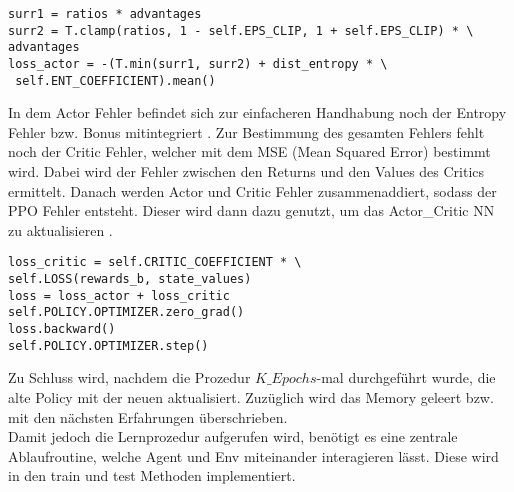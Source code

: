 \begin{lstlisting}[caption=Bestimmung der Surrogate Fehler, label=code:Bestimmung_Surrogate_Losses, style=Python]
surr1 = ratios * advantages
surr2 = T.clamp(ratios, 1 - self.EPS_CLIP, 1 + self.EPS_CLIP) * \
advantages
loss_actor = -(T.min(surr1, surr2) + dist_entropy * \
 self.ENT_COEFFICIENT).mean()
\end{lstlisting}
In dem Actor Fehler befindet sich zur einfacheren Handhabung noch der Entropy Fehler bzw. Bonus mitintegriert .
Zur Bestimmung des gesamten Fehlers fehlt noch der Critic Fehler, welcher mit dem MSE (Mean Squared Error) bestimmt wird. Dabei wird der Fehler zwischen den Returns und den Values des Critics ermittelt.
Danach werden Actor und Critic Fehler zusammenaddiert, sodass der  PPO Fehler entsteht. Dieser wird dann dazu genutzt, um das Actor\_Critic NN zu aktualisieren .
\begin{lstlisting}[caption=Bestimmung des PPO-Losses \& Update der Netze, label=code:Bestimmung_PPO_Losses_update_NN, style=Python]
loss_critic = self.CRITIC_COEFFICIENT * \ 
self.LOSS(rewards_b, state_values)
loss = loss_actor + loss_critic 
self.POLICY.OPTIMIZER.zero_grad()
loss.backward()
self.POLICY.OPTIMIZER.step()
\end{lstlisting}
Zu Schluss wird, nachdem die Prozedur $K\_Epochs$-mal durchgeführt wurde, die alte Policy mit der neuen aktualisiert. Zuzüglich wird das Memory geleert bzw. mit den nächsten Erfahrungen überschrieben.\\
Damit jedoch die Lernprozedur aufgerufen wird, benötigt es eine zentrale Ablaufroutine, welche Agent und Env miteinander interagieren lässt. Diese wird in den train und test Methoden implementiert.

